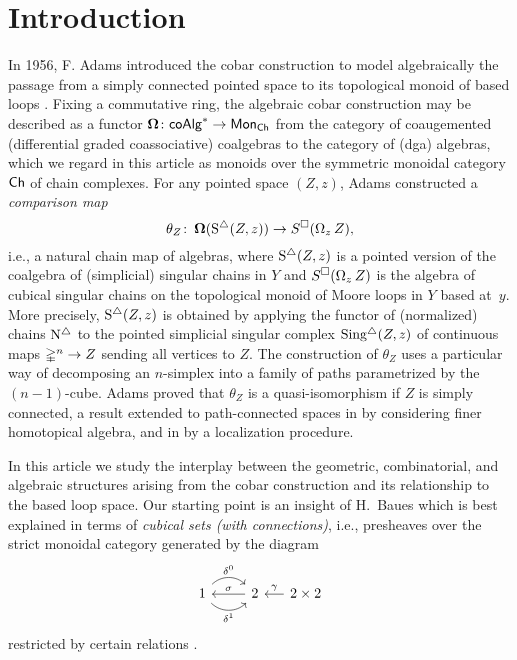 
\section{Introduction}

In 1956, F. Adams introduced the cobar construction to model algebraically the passage from a simply connected pointed space to its topological monoid of based loops \cite{adams1956cobar}.
Fixing a commutative ring, the algebraic cobar construction may be described as a functor $\operatorname{\mathbf{\Omega}} \colon \mathsf{coAlg}^\ast \to \mathsf{Mon}_{\mathsf{Ch}}$ from the category of coaugemented  (differential graded coassociative) coalgebras to the category of (dga) algebras, which we regard in this article as monoids over the symmetric monoidal category $\mathsf{Ch}$ of chain complexes.
For any pointed space $(Z, z)$, Adams constructed a \textit{comparison map}
\begin{equation} \label{e:adams map}
\theta_Z \colon \operatorname{\mathbf{\Omega}}(\operatorname{S^{\triangle}}(Z, z)) \to S^{\square}(\operatorname{\Omega}_z Z),
\end{equation}
i.e., a natural chain map of algebras, where $\operatorname{S^{\triangle}}(Z,z)$ is a pointed version of the coalgebra of (simplicial) singular chains in $Y$ and $S^{\square}(\operatorname{\Omega}_zZ)$ is the algebra of cubical singular chains on the topological monoid of Moore loops in $Y$ based at~$y$.
More precisely, $\operatorname{S^{\triangle}}(Z,z)$ is obtained by applying the functor of (normalized) chains $\operatorname{N^{\triangle}}$ to the pointed simplicial singular complex $\operatorname{Sing^{\triangle}}(Z, z)$ of continuous maps $\mathbb{\Delta}^n \to Z$ sending all vertices to $Z$. The construction of  $\theta_Z$ uses a particular way of decomposing an $n$-simplex into a family of paths parametrized by the $(n-1)$-cube. Adams proved that $\theta_Z$ is a quasi-isomorphism if $Z$ is simply connected, a result extended to path-connected spaces in \cite{rivera2018cubical} by considering finer homotopical algebra, and in \cite{hess2010cobar} by a localization procedure.

In this article we study the interplay between the geometric, combinatorial, and algebraic structures arising from the cobar construction and its relationship to the based loop space.
Our starting point is an insight of H.~Baues which is best explained in terms of \textit{cubical sets (with connections)}, i.e., presheaves over the 
strict monoidal category generated by the diagram
\[
\begin{tikzcd}
1 \arrow[r, out=45, in=135, "\delta^0"] \arrow[r, out=-45, in=-135, "\delta^1"'] & 2 \arrow[l, "\sigma"'] &[-10pt] \arrow[l, "\gamma"'] 2 \times 2
\end{tikzcd}
\]
restricted by certain relations \cite{brown1981cubes, grandis2003cubical}.

